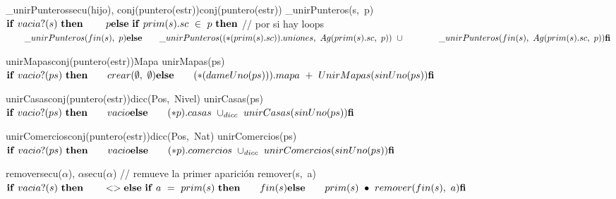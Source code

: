 \vspace{4mm}
\tadOperacion
{\_unirPunteros}{secu(hijo), conj(puntero(estr))}{conj(puntero(estr))}{}
\tadAxioma
{\_unirPunteros(s,\ p)}
{$   
    \LIF\ vacia?(s)\ \LTHEN \\                 
    \tab\ p \\
    \LELSE\ \LIF\ prim(s).sc\ \in\ p\ \LTHEN\ $\tab// por si hay loops$ \\  
    \tab \_unirPunteros(fin(s),\ p) \\
    \LELSE \\
    \tab \_unirPunteros((*(prim(s).sc)).uniones,\ Ag(prim(s).sc,\ p))\ \cup\\ 
    \tab \tab \_unirPunteros(fin(s),\ Ag(prim(s).sc,\ p)) \\
    \LFI
$}

\vspace{4mm}
\tadOperacion
{unirMapas}{conj(puntero(estr))}{Mapa}{}            
\tadAxioma
{unirMapas(ps)}{$
    \LIF\ vacio?(ps)\ \LTHEN\\ 
    \tab crear(\emptyset,\ \emptyset)\ \\
    \LELSE\ \\ 
    \tab (*(dameUno(ps))).mapa\ +\ UnirMapas(sinUno(ps))\ \\ 
    \LFI
$}

\vspace{4mm}
\tadOperacion
{unirCasas}{conj(puntero(estr))}{dicc(Pos,\ Nivel)}{}            
\tadAxioma
{unirCasas(ps)}{$
    \LIF\ vacio?(ps)\ \LTHEN\ \\ 
    \tab vacio\ \\
    \LELSE\ \\
    \tab (*p).casas\ \cup_{dicc}\ unirCasas(sinUno(ps))\ \\
    \LFI
$}

\vspace{4mm}
\tadOperacion
{unirComercios}{conj(puntero(estr))}{dicc(Pos,\ Nat)}{} 
\tadAxioma
{unirComercios(ps)}{$
    \LIF\ vacio?(ps)\ \LTHEN\ \\
    \tab vacio\ \\
    \LELSE\ \\
    \tab (*p).comercios\ \cup_{dicc}\ unirComercios(sinUno(ps))\ \\
    \LFI
$}

\vspace{4mm}
\tadOperacionInline
{remover}{secu($\alpha$), $\alpha$}{secu($\alpha$)}{} \tab // remueve la primer aparición                      
\tadAxioma
{remover(s,\ a)}{$
    \LIF\ vacia?(s)\ \LTHEN\ \\
    \tab <> \\ 
    \LELSE\ \LIF\ 
        a\ =\ prim(s)\ 
    \LTHEN\ \\
    \tab fin(s)\ \\
    \LELSE\ \\
    \tab  prim(s)\ \bullet\ remover(fin(s),\ a)\ \\
    \LFI
$}

